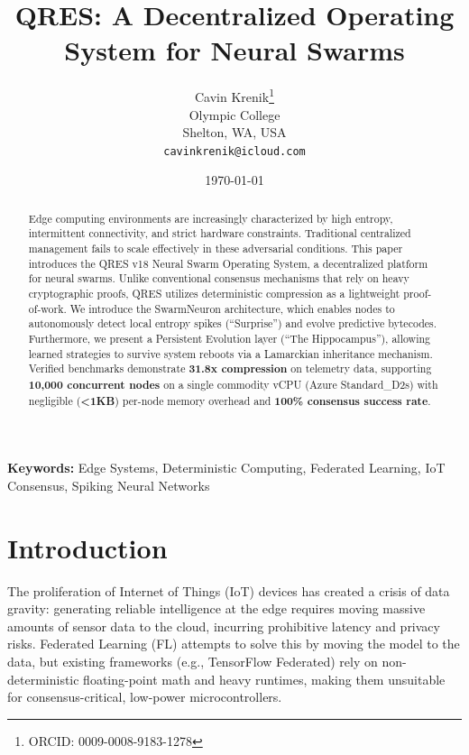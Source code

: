 \documentclass[10pt, twocolumn]{article}
\title{\textbf{QRES: A Decentralized Operating System for Neural Swarms}}
\author{
  Cavin Krenik\thanks{ORCID: 0009-0008-9183-1278} \\
  Olympic College \\
  Shelton, WA, USA \\
  \texttt{cavinkrenik@icloud.com}
}
\date{\today}
\begin{document}
\maketitle

\begin{abstract}
Edge computing environments are increasingly characterized by high entropy, intermittent connectivity, and strict hardware constraints. Traditional centralized management fails to scale effectively in these adversarial conditions. This paper introduces the QRES v18 Neural Swarm Operating System, a decentralized platform for neural swarms. Unlike conventional consensus mechanisms that rely on heavy cryptographic proofs, QRES utilizes deterministic compression as a lightweight proof-of-work. We introduce the SwarmNeuron architecture, which enables nodes to autonomously detect local entropy spikes (``Surprise'') and evolve predictive bytecodes. Furthermore, we present a Persistent Evolution layer (``The Hippocampus''), allowing learned strategies to survive system reboots via a Lamarckian inheritance mechanism. Verified benchmarks demonstrate \textbf{31.8x compression} on telemetry data, supporting \textbf{10,000 concurrent nodes} on a single commodity vCPU (Azure Standard\_D2s) with negligible (\textbf{<1KB}) per-node memory overhead and \textbf{100\% consensus success rate}.
\end{abstract}

\vspace{0.2cm}
\noindent \textbf{Keywords:} Edge Systems, Deterministic Computing, Federated Learning, IoT Consensus, Spiking Neural Networks

\section{Introduction}
The proliferation of Internet of Things (IoT) devices has created a crisis of data gravity: generating reliable intelligence at the edge requires moving massive amounts of sensor data to the cloud, incurring prohibitive latency and privacy risks. Federated Learning (FL) \cite{mcmahan2017communication, bonawitz2017practical} attempts to solve this by moving the model to the data, but existing frameworks (e.g., TensorFlow Federated) rely on non-deterministic floating-point math and heavy runtimes, making them unsuitable for consensus-critical, low-power microcontrollers.
\end{document}
